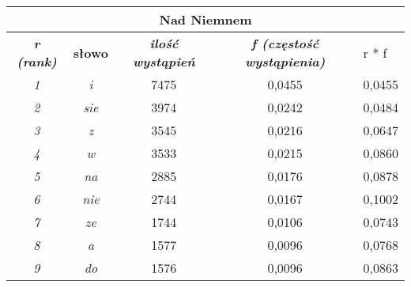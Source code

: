\documentclass[a4paper]{article}
\begin{document}
\begin{table}
\begin{tabular}{ccc|c|l|}
\hline
\multicolumn{5}{|c|}{\textbf{Nad Niemnem}}                                                                                                                                       \\ \hline
\multicolumn{1}{|c|}{\textit{\textbf{r (rank)}}} & \multicolumn{1}{c|}{\textbf{słowo}} & \textit{\textbf{ilość wystąpień}} & \textit{\textbf{f (częstość wystąpienia)}} & r * f  \\ \hline
\multicolumn{1}{|c|}{\textit{1}}                 & \multicolumn{1}{c|}{\textit{i}}     & 7475                              & 0,0455                                     & 0,0455 \\ \hline
\multicolumn{1}{|c|}{\textit{2}}                 & \multicolumn{1}{c|}{\textit{sie}}   & 3974                              & 0,0242                                     & 0,0484 \\ \hline
\multicolumn{1}{|c|}{\textit{3}}                 & \multicolumn{1}{c|}{\textit{z}}     & 3545                              & 0,0216                                     & 0,0647 \\ \hline
\multicolumn{1}{|c|}{\textit{4}}                 & \multicolumn{1}{c|}{\textit{w}}     & 3533                              & 0,0215                                     & 0,0860 \\ \hline
\multicolumn{1}{|c|}{\textit{5}}                 & \multicolumn{1}{c|}{\textit{na}}    & 2885                              & 0,0176                                     & 0,0878 \\ \hline
\multicolumn{1}{|c|}{\textit{6}}                 & \multicolumn{1}{c|}{\textit{nie}}   & 2744                              & 0,0167                                     & 0,1002 \\ \hline
\multicolumn{1}{|c|}{\textit{7}}                 & \multicolumn{1}{c|}{\textit{ze}}    & 1744                              & 0,0106                                     & 0,0743 \\ \hline
\multicolumn{1}{|c|}{\textit{8}}                 & \multicolumn{1}{c|}{\textit{a}}     & 1577                              & 0,0096                                     & 0,0768 \\ \hline
\multicolumn{1}{|c|}{\textit{9}}                 & \multicolumn{1}{c|}{\textit{do}}    & 1576                              & 0,0096                                     & 0,0863 \\ \hline

\end{tabular}
\end{table}
\end{document}

